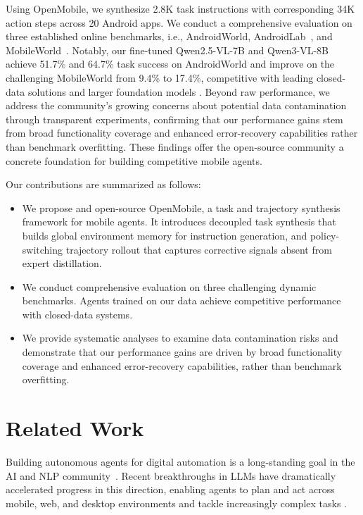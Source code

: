 \documentclass{article} %
\begin{document}
Using OpenMobile, we synthesize 2.8K task instructions with corresponding 34K action steps across 20 Android apps.
We conduct a comprehensive evaluation on three established online benchmarks, i.e., AndroidWorld, AndroidLab~\citep{xu2025androidlab}, and MobileWorld~\citep{kong2025mobileworld}.
Notably, our fine-tuned Qwen2.5-VL-7B and Qwen3-VL-8B achieve 51.7\% and 64.7\% task success on AndroidWorld and improve on the challenging MobileWorld from 9.4\% to 17.4\%, competitive with leading closed-data solutions and larger foundation models \citep{bai2025qwen3}.
Beyond raw performance, we address the community's growing concerns about potential data contamination through transparent experiments, confirming that our performance gains stem from broad functionality coverage and enhanced error-recovery capabilities rather than benchmark overfitting.
These findings offer the open-source community a concrete foundation for building competitive mobile agents.

Our contributions are summarized as follows:

\begin{itemize}[leftmargin=1.5em]
  \item We propose and open-source OpenMobile, a task and trajectory synthesis framework for mobile agents. It introduces decoupled task synthesis that builds global environment memory for instruction generation, and policy-switching trajectory rollout that captures corrective signals absent from expert distillation.
  \item We conduct comprehensive evaluation on three challenging dynamic benchmarks. Agents trained on our data achieve competitive performance with closed-data systems.
  \item We provide systematic analyses to examine data contamination risks and demonstrate that our performance gains are driven by broad functionality coverage and enhanced error-recovery capabilities, rather than benchmark overfitting.
\end{itemize}

\section{Related Work}

Building autonomous agents for digital automation is a long-standing goal in the AI and NLP community~\citep{branavan2009reinforcement, shi2017world, shaw2023pixels}. 
Recent breakthroughs in LLMs have dramatically accelerated progress in this direction, enabling agents to plan and act across mobile, web, and desktop environments and tackle increasingly complex tasks \citep{rawles2024androidworld, zhou2023webarena, xie2024osworld, sun2025scienceboard}.
\end{document}
